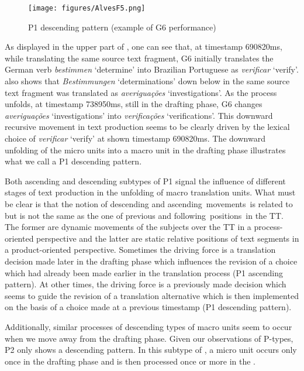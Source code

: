 \documentclass[output=paper]{LSP/langsci}
\begin{document}
\begin{figure}
\texttt{[image: figures/AlvesF5.png]}
\caption{P1 descending pattern (example of G6 performance)}
\label{fig:alves:5}
\end{figure} 

As displayed in the upper part of , one can see that, at timestamp 690820ms, while translating the same source text fragment, G6 initially translates the German verb \textit{bestimmen} `determine' into Brazilian Portuguese as \textit{verificar} `verify'.  also shows that \textit{Bestimmungen} `determinations' down below in the same source text fragment was translated as \textit{averiguações} `investigations'. As the process unfolds, at timestamp 738950ms, still in the drafting phase, G6 changes \textit{averiguações} `investigations' into \textit{verificações} `verifications'. This downward recursive movement in text production seems to be clearly driven by the lexical choice of  \textit{verificar} `verify' at shown timestamp 690820ms. The downward unfolding of the micro units into a macro unit in the drafting phase illustrates what we call a P1 descending pattern.

Both ascending and descending subtypes of P1 signal the influence of different stages of text production in the unfolding of macro translation units. What must be clear is that the notion of descending and ascending~movements~is related to but is not the same as the one of previous and following~positions~in the TT. The former are dynamic movements of the subjects over the TT in a process-oriented perspective and the latter are static relative positions of text segments in a product-oriented perspective. Sometimes the driving force is a translation decision made later in the drafting phase which influences the revision of a choice which had already been made earlier in the translation process (P1 ascending pattern). At other times, the driving force is a previously made decision which seems to guide the revision of a translation alternative which is then implemented on the basis of a choice made at a previous timestamp (P1 descending pattern).

Additionally, similar processes of descending types of macro units seem to occur when we move away from the drafting phase. Given our observations of P-types, P2 only shows a descending pattern. In this subtype of , a micro unit occurs only once in the drafting phase and is then processed once or more in the .
\end{document}
